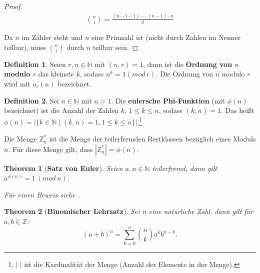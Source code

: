 \documentclass[12pt,oneside]{article}
\newtheorem{theorem}{Theorem}[section]
\theoremstyle{remark}
\theoremstyle{definition}
\newtheorem{definition}{Definition}[section]
\begin{document}
\begin{proof}
\begin{align*}\label{modb}
    {n \choose i} = \frac{(n - i - 1) \cdot  \cdot  \cdot (n - 1) \cdot n }{i!}
\end{align*}

Da $n$ im Zähler steht und $n$ eine Primzahl ist (nicht durch Zahlen im Nenner teilbar), muss ${n \choose i}$ durch $n$ teilbar sein. 
\end{proof}

\smallskip

\begin{definition}\label{Df_4}
Seien $r,n \in \mathbb{N}$ mit $(n,r) = 1$, dann ist die \textbf{Ordnung von $n$ modulo $r$} das kleinste $k$, sodass $n^k = 1 (mod \, r)$. Die Ordnung von $n$ modulo $r$ wird mit $o_{r}(n)$ bezeichnet.
\end{definition}

\smallskip 

   
\begin{definition}\label{Df_6}
Sei $n \in \mathbb{N}$ mit $n > 1$. Die \textbf{eulersche Phi-Funktion} (mit $\phi(n)$ bezeichnet) ist die Anzahl der Zahlen $k, \, 1 \leq k \leq n$, sodass $(k,n) = 1$. Das heißt $\phi(n) = |\{ k \in \mathbb{N} \mid (k,n) = 1, 1 \leq k \leq n \}|$.\footnote{$| \cdot |$ ist die Kardinalität der Menge (Anzahl der Elemente in der Menge).}
\end{definition}

Die Menge $\mathbb{Z}_{n}^{*}$ ist die Menge der teilerfremden Restklassen bezüglich eines Moduls $n$. Für diese Menge gilt, dass  $|\mathbb{Z}_{n}^{*}| = \phi(n)$.

\smallskip

\begin{theorem}[\textbf{Satz von Euler}]\label{Th_1}
Seien $a,n \in \mathbb{N}$ teilerfremd, \newline dann gilt $a^{\phi(n)} = 1 \, (mod \, n) $.\newline

Für einen Beweis siehe \cite{eulerthm}.
\end{theorem}


\smallskip

\begin{theorem}[\textbf{Binomischer Lehrsatz}]\label{Th_3}
Sei n eine natürliche Zahl, dann gilt für $a,b \in \mathbb{Z}$:\newline\newline
 \begin{equation}
     (a + b)^n  = \sum_{k=0}^n {n \choose k} a^k b^{n-k}.
 \end{equation}
\end{theorem}
\end{document}
